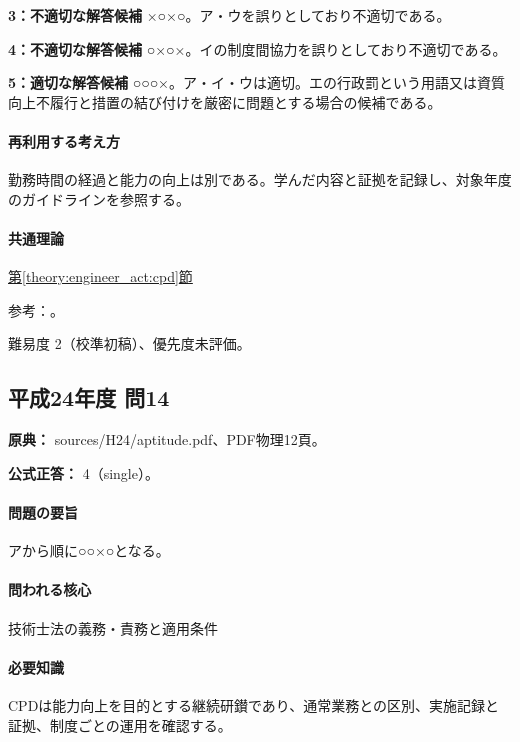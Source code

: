 \noindent\textbf{3：不適切な解答候補} ×○×○。ア・ウを誤りとしており不適切である。\par

\noindent\textbf{4：不適切な解答候補} ○×○×。イの制度間協力を誤りとしており不適切である。\par

\noindent\textbf{5：適切な解答候補} ○○○×。ア・イ・ウは適切。エの行政罰という用語又は資質向上不履行と措置の結び付けを厳密に問題とする場合の候補である。\par

\paragraph{再利用する考え方} 勤務時間の経過と能力の向上は別である。学んだ内容と証拠を記録し、対象年度のガイドラインを参照する。

\paragraph{共通理論} \hyperref[theory:engineer_act:cpd]{第\ref*{theory:engineer_act:cpd}節}

\par 参考：\cite{engineer_act_current,cpd_v1}。

\par 難易度 2（校準初稿）、優先度未評価。

\subsection{平成24年度 問14}
\label{q:h24-reg-apt-14}

\noindent\textbf{原典：} sources/H24/aptitude.pdf、PDF物理12頁。

\textbf{公式正答：} 4（single）。

\paragraph{問題の要旨} アから順に○○×○となる。

\paragraph{問われる核心} 技術士法の義務・責務と適用条件

\paragraph{必要知識} CPDは能力向上を目的とする継続研鑚であり、通常業務との区別、実施記録と証拠、制度ごとの運用を確認する。

